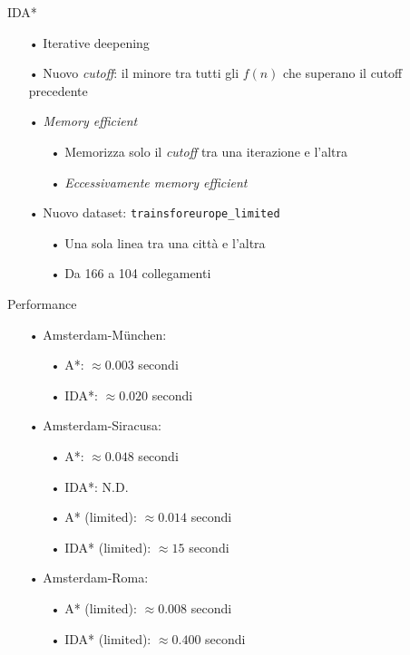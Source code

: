 \documentclass{beamer}
\begin{document}
    \begin{frame}{IDA*}
        \begin{itemize}
            \item[•] Iterative deepening
            \item[•] Nuovo \textit{cutoff}: il minore tra tutti gli $f(n)$ che superano il cutoff precedente
            \item[•] \textit{Memory efficient}
            \begin{itemize}
                \item[•] Memorizza solo il \textit{cutoff} tra una iterazione e l'altra
                \item[•] \textit{Eccessivamente memory efficient}
            \end{itemize}
            \item[•] Nuovo dataset: \texttt{trainsforeurope\_limited}
            \begin{itemize}
                \item[•] Una sola linea tra una città e l'altra
                \item[•] Da 166 a 104 collegamenti
            \end{itemize}
        \end{itemize}
    \end{frame}

    \begin{frame}{Performance}
        \begin{itemize}
            \item[•] Amsterdam-München:
            \begin{itemize}
                \item[•] A*: $\approx 0.003$ secondi
                \item[•] IDA*: $\approx 0.020$ secondi
            \end{itemize}
            \item[•] Amsterdam-Siracusa:
            \begin{itemize}
                \item[•] A*: $\approx 0.048$ secondi
                \item[•] IDA*: N.D.
                \item[•] A* (limited): $\approx 0.014$ secondi
                \item[•] IDA* (limited): $\approx 15$ secondi
            \end{itemize}
            \item[•] Amsterdam-Roma:
            \begin{itemize}
                \item[•] A* (limited): $\approx 0.008$ secondi
                \item[•] IDA* (limited): $\approx 0.400$ secondi
            \end{itemize}
        \end{itemize}
    \end{frame}
\end{document}
